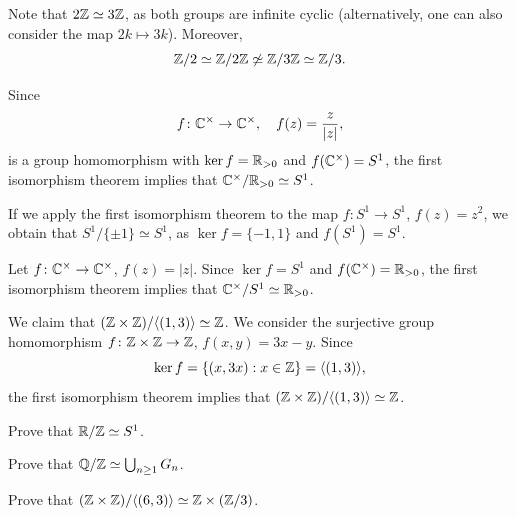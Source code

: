 \begin{example}
Note that $2\mathbb{Z}\simeq 3\mathbb{Z}$, as both groups are infinite cyclic (alternatively, one can also consider the map $2k\mapsto 3k$). Moreover, 
\[
\mathbb{Z}/2\simeq\mathbb{Z}/2\mathbb{Z}\not\simeq\mathbb{Z}/3\mathbb{Z}\simeq\mathbb{Z}/3.
\]
\end{example}

\begin{example}
Since 
\[
f\colon\mathbb{C}^\times\to\mathbb{C}^\times,
\quad
f(z)=\frac{z}{|z|},
\]
is a group homomorphism with $\ker f=\mathbb{R}_{>0}$ and
$f(\mathbb{C}^\times)=S^1$, the first isomorphism theorem 
implies that 
$\mathbb{C}^\times/\mathbb{R}_{>0}\simeq S^1$.
\end{example}

\begin{example}
If we apply the first isomorphism theorem to the
map $f\colon S^1\to S^1$, $f(z)=z^2$, we obtain that 
$S^1/\{\pm1\}\simeq S^1$, as 
$\ker f=\{-1,1\}$ and $f(S^1)=S^1$.
\end{example}

\begin{example}
Let $f\colon\mathbb{C}^\times\to\mathbb{C}^\times$, $f(z)=|z|$. Since $\ker f=S^1$ and $f(\mathbb{C}^\times)=\mathbb{R}_{>0}$, the first isomorphism theorem 
implies that $\mathbb{C}^\times/S^1\simeq\mathbb{R}_{>0}$.
\end{example}

\begin{example}
We claim that 
$(\mathbb{Z}\times\mathbb{Z})/\langle (1,3)\rangle\simeq\mathbb{Z}$. We consider
the surjective group homomorphism 
$f\colon\mathbb{Z}\times\mathbb{Z}\to\mathbb{Z}$, $f(x,y)=3x-y$. Since 
\[
\ker f=\{(x,3x):x\in\mathbb{Z}\}=\langle (1,3)\rangle,
\]
the first isomorphism theorem implies that 
$(\mathbb{Z}\times\mathbb{Z})/\langle (1,3)\rangle\simeq\mathbb{Z}$.
\end{example}


\begin{exercise}
Prove that $\mathbb{R}/\mathbb{Z}\simeq S^1$.
\end{exercise}



\begin{exercise}
Prove that $\mathbb{Q}/\mathbb{Z}\simeq\bigcup_{n\geq1}G_n$.
\end{exercise}


\begin{exercise}
Prove that 
$(\mathbb{Z}\times\mathbb{Z})/\langle (6,3)\rangle\simeq\mathbb{Z}\times(\mathbb{Z}/3)$.
\end{exercise}

